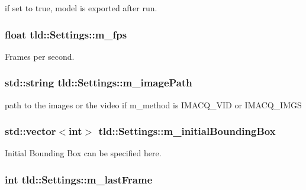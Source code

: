 if set to true, model is exported after run. 

\hypertarget{classtld_1_1_settings_aaa119898fb2f14ce2eed7fc861733eac}{
\subsubsection[{m\_\-fps}]{\setlength{\rightskip}{0pt plus 5cm}float {\bf tld::Settings::m\_\-fps}}}
\label{classtld_1_1_settings_aaa119898fb2f14ce2eed7fc861733eac}


Frames per second. 

\hypertarget{classtld_1_1_settings_abfd40dee05d0005e6cdaab2e0a84a4a9}{
\subsubsection[{m\_\-imagePath}]{\setlength{\rightskip}{0pt plus 5cm}std::string {\bf tld::Settings::m\_\-imagePath}}}
\label{classtld_1_1_settings_abfd40dee05d0005e6cdaab2e0a84a4a9}


path to the images or the video if m\_\-method is IMACQ\_\-VID or IMACQ\_\-IMGS 

\hypertarget{classtld_1_1_settings_a42d73d86dc15625a1394e7491ebaf0e4}{
\subsubsection[{m\_\-initialBoundingBox}]{\setlength{\rightskip}{0pt plus 5cm}std::vector$<$int$>$ {\bf tld::Settings::m\_\-initialBoundingBox}}}
\label{classtld_1_1_settings_a42d73d86dc15625a1394e7491ebaf0e4}


Initial Bounding Box can be specified here. 

\hypertarget{classtld_1_1_settings_a4935fe002dd6358506813d7c48ec5322}{
\subsubsection[{m\_\-lastFrame}]{\setlength{\rightskip}{0pt plus 5cm}int {\bf tld::Settings::m\_\-lastFrame}}}
\label{classtld_1_1_settings_a4935fe002dd6358506813d7c48ec5322}


